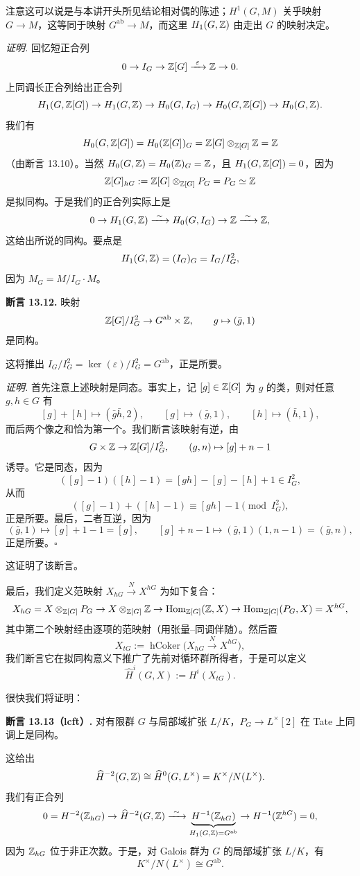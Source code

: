 注意这可以说是与本讲开头所见结论相对偶的陈述；$H^{1}(G,M)$ 关乎映射 $G\to M$，这等同于映射 $G^{\mathrm{ab}}\to M$，而这里 $H_{1}(G,\mathbb{Z})$ 由走出 $G$ 的映射决定。

\textit{证明.} 回忆短正合列
\[
0\to I_{G}\to\mathbb{Z}[G]\xrightarrow{\ \varepsilon\ }\mathbb{Z}\to 0.
\]
上同调长正合列给出正合列
\[
H_{1}(G,\mathbb{Z}[G])\to H_{1}(G,\mathbb{Z})\to H_{0}(G,I_{G})\to H_{0}(G,\mathbb{Z}[G])\to H_{0}(G,\mathbb{Z}).
\]
我们有
\[
H_{0}(G,\mathbb{Z}[G])=H_{0}(\mathbb{Z}[G])_{G}=\mathbb{Z}[G]\otimes_{\mathbb{Z}[G]}\mathbb{Z}=\mathbb{Z}
\]
（由断言 13.10）。当然 $H_{0}(G,\mathbb{Z})=H_{0}(\mathbb{Z})_{G}=\mathbb{Z}$，且 $H_{1}(G,\mathbb{Z}[G])=0$，因为
\[
\mathbb{Z}[G]_{hG}:=\mathbb{Z}[G]\otimes_{\mathbb{Z}[G]}P_{G}=P_{G}\simeq\mathbb{Z}
\]
是拟同构。于是我们的正合列实际上是
\[
0\to H_{1}(G,\Z)\xrightarrow{\ \sim\ }H_{0}(G,I_{G})\to\Z\xrightarrow{\ \sim\ }\Z,
\]
这给出所说的同构。要点是
\[
H_{1}(G,\mathbb{Z})=(I_{G})_{G}=I_{G}/I_{G}^{2},
\]
因为 $M_{G}=M/I_{G}\cdot M$。

\textbf{断言 13.12.} 映射
\[
\mathbb{Z}[G]/I_{G}^{2}\to G^{\mathrm{ab}}\times\mathbb{Z},\qquad g\mapsto(\bar g,1)
\]
是同构。

这将推出 $I_{G}/I_{G}^{2}=\ker(\varepsilon)/I_{G}^{2}=G^{\mathrm{ab}}$，正是所要。

\textit{证明.} 首先注意上述映射是同态。事实上，记 $[g]\in\mathbb{Z}[G]$ 为 $g$ 的类，则对任意 $g,h\in G$ 有
\[
[g]+[h]\mapsto(\bar g\bar h,2),\qquad [g]\mapsto(\bar g,1),\qquad [h]\mapsto(\bar h,1),
\]
而后两个像之和恰为第一个。我们断言该映射有逆，由
\[
G\times\mathbb{Z}\to\mathbb{Z}[G]/I_{G}^{2},\qquad (g,n)\mapsto[g]+n-1
\]
诱导。它是同态，因为
\[
([g]-1)([h]-1)=[gh]-[g]-[h]+1\in I_{G}^{2},
\]
从而
\[
([g]-1)+([h]-1)\equiv[gh]-1\pmod{I_{G}^{2}},
\]
正是所要。最后，二者互逆，因为
\[
(\bar g,1)\mapsto[g]+1-1=[g],\qquad [g]+n-1\mapsto(\bar g,1)(1,n-1)=(\bar g,n),
\]
正是所要。\hfill$\square$

这证明了该断言。

最后，我们定义范映射 $X_{hG}\xrightarrow{\ N\ }X^{hG}$ 为如下复合：
\[
X_{hG}=X\otimes_{\mathbb{Z}[G]}P_{G}\to X\otimes_{\mathbb{Z}[G]}\mathbb{Z}\to\operatorname{Hom}_{\mathbb{Z}[G]}(\mathbb{Z},X)\to\operatorname{Hom}_{\mathbb{Z}[G]}(P_{G},X)=X^{hG},
\]
其中第二个映射经由逐项的范映射（用张量–同调伴随）。然后置
\[
X_{tG}:=\operatorname{hCoker}\bigl(X_{hG}\xrightarrow{\ N\ }X^{hG}\bigr),
\]
我们断言它在拟同构意义下推广了先前对循环群所得者，于是可以定义
\[
\widehat{H}^{i}(G,X):=H^{i}(X_{tG}).
\]

很快我们将证明：

\textbf{断言 13.13（lcft）.} 对有限群 $G$ 与局部域扩张 $L/K$，$P_{G}\to L^{\times}[2]$ 在 Tate 上同调上是同构。

这给出
\[
\widehat{H}^{-2}(G,\mathbb{Z})\cong\widehat{H}^{0}(G,L^{\times})=K^{\times}/N(L^{\times}).
\]
我们有正合列
\[
0=H^{-2}(\Z_{hG})\to\widehat{H}^{-2}(G,\Z)\xrightarrow{\ \sim\ }\underbrace{H^{-1}(\Z_{hG})}_{H_{1}(G,\Z)=G^{\mathrm{ab}}}\to H^{-1}(\Z^{hG})=0,
\]
因为 $\mathbb{Z}_{hG}$ 位于非正次数。于是，对 Galois 群为 $G$ 的局部域扩张 $L/K$，有
\[
K^{\times}/N(L^{\times})\cong G^{\mathrm{ab}}.
\]
